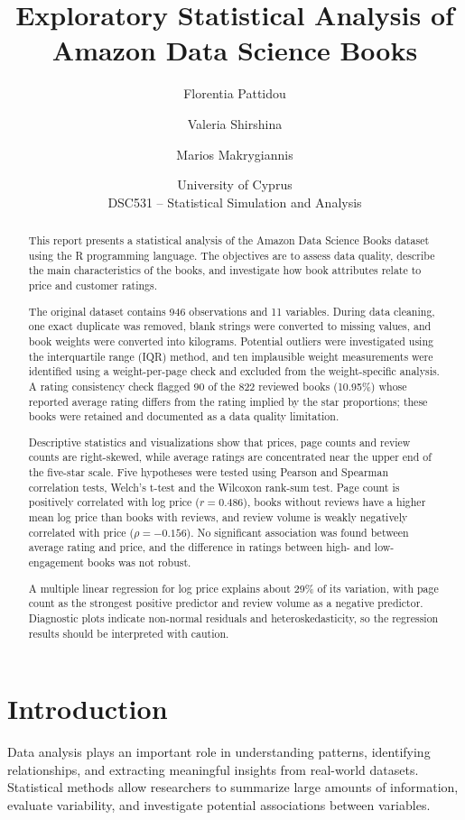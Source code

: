 \documentclass[11pt,a4paper]{article}
\title{Exploratory Statistical Analysis of
Amazon Data Science Books}
\author{
Florentia Pattidou \and
Valeria Shirshina \and
Marios Makrygiannis
}
\date{University of Cyprus\\
DSC531 -- Statistical Simulation and Analysis}
\begin{document}
\maketitle
\newpage
\begin{abstract}
This report presents a statistical analysis of the Amazon Data Science Books dataset using the R programming language. The objectives are to assess data quality, describe the main characteristics of the books, and investigate how book attributes relate to price and customer ratings.

The original dataset contains 946 observations and 11 variables. During data cleaning, one exact duplicate was removed, blank strings were converted to missing values, and book weights were converted into kilograms. Potential outliers were investigated using the interquartile range (IQR) method, and ten implausible weight measurements were identified using a weight-per-page check and excluded from the weight-specific analysis. A rating consistency check flagged 90 of the 822 reviewed books (10.95\%) whose reported average rating differs from the rating implied by the star proportions; these books were retained and documented as a data quality limitation.

Descriptive statistics and visualizations show that prices, page counts and review counts are right-skewed, while average ratings are concentrated near the upper end of the five-star scale. Five hypotheses were tested using Pearson and Spearman correlation tests, Welch's t-test and the Wilcoxon rank-sum test. Page count is positively correlated with log price ($r = 0.486$), books without reviews have a higher mean log price than books with reviews, and review volume is weakly negatively correlated with price ($\rho = -0.156$). No significant association was found between average rating and price, and the difference in ratings between high- and low-engagement books was not robust.

A multiple linear regression for log price explains about 29\% of its variation, with page count as the strongest positive predictor and review volume as a negative predictor. Diagnostic plots indicate non-normal residuals and heteroskedasticity, so the regression results should be interpreted with caution.
\end{abstract}
\newpage
\tableofcontents
\newpage
\section{Introduction}
Data analysis plays an important role in understanding patterns, identifying relationships, and extracting meaningful insights from real-world datasets. Statistical methods allow researchers to summarize large amounts of information, evaluate variability, and investigate potential associations between variables.
\end{document}
